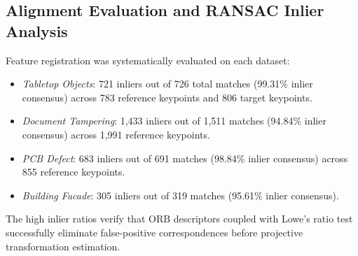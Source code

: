 \documentclass[conference]{IEEEtran}
\begin{document}
\subsection{Alignment Evaluation and RANSAC Inlier Analysis}
Feature registration was systematically evaluated on each dataset:
\begin{itemize}
    \item \textit{Tabletop Objects}: 721 inliers out of 726 total matches (99.31\% inlier consensus) across 783 reference keypoints and 806 target keypoints.
    \item \textit{Document Tampering}: 1,433 inliers out of 1,511 matches (94.84\% inlier consensus) across 1,991 reference keypoints.
    \item \textit{PCB Defect}: 683 inliers out of 691 matches (98.84\% inlier consensus) across 855 reference keypoints.
    \item \textit{Building Facade}: 305 inliers out of 319 matches (95.61\% inlier consensus).
\end{itemize}
The high inlier ratios verify that ORB descriptors coupled with Lowe's ratio test successfully eliminate false-positive correspondences before projective transformation estimation.
\end{document}
